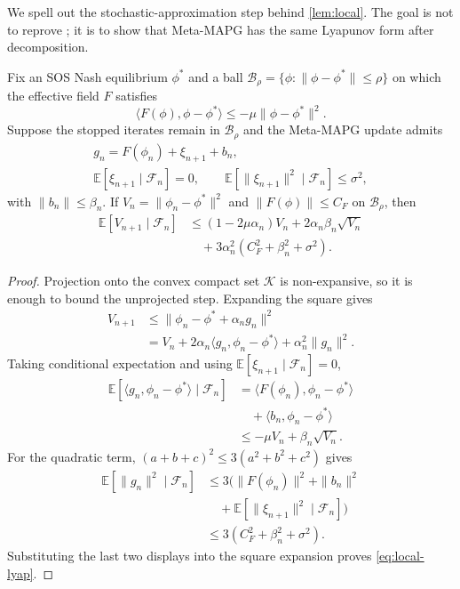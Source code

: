 \documentclass{nextgame2026} %
\newcommand{\E}{\mathbb{E}}
\newcommand{\K}{\mathcal{K}}
\newcommand{\B}{\mathcal{B}}
\newcommand{\F}{\mathcal{F}}
\begin{document}
We spell out the stochastic-approximation step behind \cref{lem:local}. The goal is not to reprove \citet{giannou2022convergence}; it is to show that Meta-MAPG has the same Lyapunov form after decomposition.

\begin{lemma}\label{lem:app-lyapunov}
Fix an SOS Nash equilibrium $\phi^\ast$ and a ball $\B_\rho=\{\phi:\|\phi-\phi^\ast\|\le\rho\}$ on which the effective field $F$ satisfies
\[
\langle F(\phi),\phi-\phi^\ast\rangle\le -\mu\|\phi-\phi^\ast\|^2 .
\]
Suppose the stopped iterates remain in $\B_\rho$ and the Meta-MAPG update admits
\[
\begin{gathered}
g_n=F(\phi_n)+\xi_{n+1}+b_n,\\
\E[\xi_{n+1}\mid\F_n]=0,\qquad
\E[\|\xi_{n+1}\|^2\mid\F_n]\le\sigma^2,
\end{gathered}
\]
with $\|b_n\|\le\beta_n$. If $V_n=\|\phi_n-\phi^\ast\|^2$ and $\|F(\phi)\|\le C_F$ on $\B_\rho$, then
\begin{equation}\label{eq:local-lyap}
\begin{aligned}
\E[V_{n+1}\mid\F_n]
&\le (1-2\mu\alpha_n)V_n
   +2\alpha_n\beta_n\sqrt{V_n}\\
&\quad+3\alpha_n^2(C_F^2+\beta_n^2+\sigma^2).
\end{aligned}
\end{equation}
\end{lemma}

\begin{proof}
Projection onto the convex compact set $\K$ is non-expansive, so it is enough to bound the unprojected step. Expanding the square gives
\[
\begin{aligned}
V_{n+1}
&\le \|\phi_n-\phi^\ast+\alpha_n g_n\|^2\\
&=V_n+2\alpha_n\langle g_n,\phi_n-\phi^\ast\rangle
  +\alpha_n^2\|g_n\|^2 .
\end{aligned}
\]
Taking conditional expectation and using $\E[\xi_{n+1}\mid\F_n]=0$,
\[
\begin{aligned}
\E[\langle g_n,\phi_n-\phi^\ast\rangle\mid\F_n]
&=\langle F(\phi_n),\phi_n-\phi^\ast\rangle\\
&\quad+\langle b_n,\phi_n-\phi^\ast\rangle\\
&\le -\mu V_n+\beta_n\sqrt{V_n}.
\end{aligned}
\]
For the quadratic term, $(a+b+c)^2\le 3(a^2+b^2+c^2)$ gives
\[
\begin{aligned}
\E[\|g_n\|^2\mid\F_n]
&\le 3\bigl(\|F(\phi_n)\|^2+\|b_n\|^2\\
&\quad+\E[\|\xi_{n+1}\|^2\mid\F_n]\bigr)\\
&\le 3(C_F^2+\beta_n^2+\sigma^2).
\end{aligned}
\]
Substituting the last two displays into the square expansion proves \eqref{eq:local-lyap}.
\end{proof}
\end{document}
